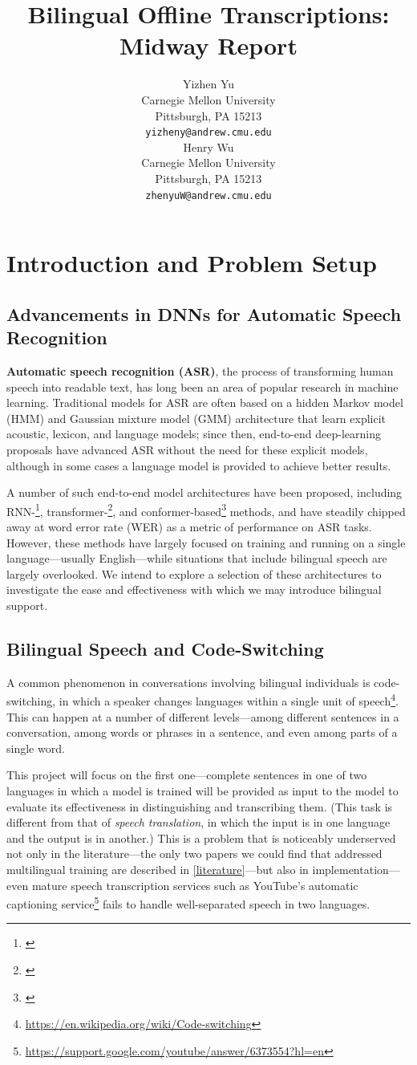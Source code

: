 \documentclass{article}
\title{Bilingual Offline Transcriptions: Midway Report}
\author{
  Yizhen Yu \\
  Carnegie Mellon University\\
  Pittsburgh, PA 15213 \\
  \texttt{yizheny@andrew.cmu.edu} \\\And
  Henry Wu \\
  Carnegie Mellon University \\
  Pittsburgh, PA 15213 \\
  \texttt{zhenyuW@andrew.cmu.edu}
}
\begin{document}
  \maketitle
  \section{Introduction and Problem Setup}
  \subsection{Advancements in DNNs for Automatic Speech Recognition}
  \textbf{Automatic speech recognition (ASR)}, the process of transforming human speech into readable text, has long been an area of popular research in machine learning. Traditional models for ASR are often based on a hidden Markov model (HMM) and Gaussian mixture model (GMM) architecture that learn explicit acoustic, lexicon, and language models; since then, end-to-end deep-learning proposals have advanced ASR without the need for these explicit models, although in some cases a language model is provided to achieve better results.

  A number of such end-to-end model architectures have been proposed, including RNN-\footnote{\cite{Chan}}, transformer-\footnote{\cite{Vaswani}}, and conformer-based\footnote{\cite{Gulati}} methods, and have steadily chipped away at word error rate (WER) as a metric of performance on ASR tasks. However, these methods have largely focused on training and running on a single language---usually English---while situations that include bilingual speech are largely overlooked. We intend to explore a selection of these architectures to investigate the ease and effectiveness with which we may introduce bilingual support.
  \subsection{Bilingual Speech and Code-Switching}
  A common phenomenon in conversations involving bilingual individuals is code-switching, in which a speaker changes languages within a single unit of speech\footnote{\url{https://en.wikipedia.org/wiki/Code-switching}}. This can happen at a number of different levels---among different sentences in a conversation, among words or phrases in a sentence, and even among parts of a single word.

  This project will focus on the first one---complete sentences in one of two languages in which a model is trained will be provided as input to the model to evaluate its effectiveness in distinguishing and transcribing them. (This task is different from that of \textit{speech translation}, in which the input is in one language and the output is in another.) This is a problem that is noticeably underserved not only in the literature---the only two papers we could find that addressed multilingual training are described in \ref{literature}---but also in implementation---even mature speech transcription services such as YouTube's automatic captioning service\footnote{\url{https://support.google.com/youtube/answer/6373554?hl=en}} fails to handle well-separated speech in two languages.
\end{document}

